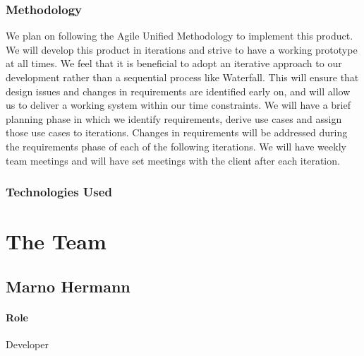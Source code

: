 \documentclass{article}
\begin{document}
        \subsubsection{Methodology}
        We plan on following the Agile Unified Methodology to implement this product. We will develop this product in iterations and strive to have a working prototype at all times. We feel that it is beneficial to adopt an iterative approach to our development rather than a sequential process like Waterfall. This will ensure that design issues and changes in requirements are identified early on, and will allow us to deliver a working system within our time constraints. We will have a brief planning phase in which we identify requirements, derive use cases and assign those use cases to iterations. Changes in requirements will be addressed during the requirements phase of each of the following iterations. We will have weekly team meetings and will have set meetings with the client after each iteration.
        \subsubsection{Technologies Used}
            \lipsum[1]
            
            \lipsum[2]
            
            \lipsum[3]
            
\newpage
\section{The Team}
    \subsection{Marno Hermann}
        \paragraph{Role} Developer
    
\end{document}

